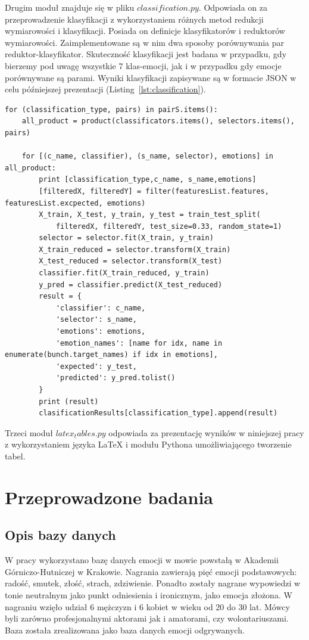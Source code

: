 \documentclass[a4paper,12pt,twoside,openany]{report}
\newcommand{\Lst}[1]{(Listing~\ref{#1})}
\begin{document}
Drugim moduł znajduje się w pliku $classification.py$.
Odpowiada on za przeprowadzenie klasyfikacji z wykorzystaniem różnych metod redukcji wymiarowości i klasyfikacji.
Posiada on definicje klasyfikatorów i reduktorów wymiarowości. 
Zaimplementowane są w nim dwa sposoby porównywania par reduktor-klasyfikator.
Skuteczność klasyfikacji jest badana w przypadku, gdy bierzemy pod uwagę wszystkie 7 klas-emocji, jak i w przypadku gdy emocje porównywane są parami.
Wyniki klasyfikacji zapisywane są w formacie JSON w celu późniejszej prezentacji \Lst{lst:classification}.
\begin{lstlisting}[caption={Klasyfikacja emocji},label={lst:classification}]
for (classification_type, pairs) in pairS.items():
    all_product = product(classificators.items(), selectors.items(), pairs)

    for [(c_name, classifier), (s_name, selector), emotions] in all_product:
        print [classification_type,c_name, s_name,emotions]
        [filteredX, filteredY] = filter(featuresList.features, featuresList.excpected, emotions)
        X_train, X_test, y_train, y_test = train_test_split(
            filteredX, filteredY, test_size=0.33, random_state=1)
        selector = selector.fit(X_train, y_train)
        X_train_reduced = selector.transform(X_train)
        X_test_reduced = selector.transform(X_test)
        classifier.fit(X_train_reduced, y_train)
        y_pred = classifier.predict(X_test_reduced)
        result = {
            'classifier': c_name,
            'selector': s_name,
            'emotions': emotions,
            'emotion_names': [name for idx, name in enumerate(bunch.target_names) if idx in emotions],
            'expected': y_test,
            'predicted': y_pred.tolist()
        }
        print (result)
        clasificationResults[classification_type].append(result)
\end{lstlisting}

Trzeci moduł $latex_tables.py$ odpowiada za prezentację wyników w niniejszej pracy z wykorzystaniem języka \LaTeX{} i modułu Pythona umożliwiającego tworzenie tabel. 
\chapter{Przeprowadzone badania}
\section{Opis bazy danych}\label{sec:opis_bazy_danych}
W pracy wykorzystano bazę danych emocji w mowie powstałą w Akademii Górniczo-Hutniczej w Krakowie.
Nagrania zawierają pięć emocji podstawowych: radość, smutek, złość, strach, zdziwienie.
Ponadto zostały nagrane wypowiedzi w tonie neutralnym jako punkt odniesienia i ironicznym, jako emocja złożona.
W nagraniu wzięło udział 6 mężczyzn i 6 kobiet w wieku od 20 do 30 lat. 
Mówcy byli zarówno profesjonalnymi aktorami jak i amatorami, czy wolontariuszami.
Baza została zrealizowana jako baza danych emocji odgrywanych. 
\end{document}

